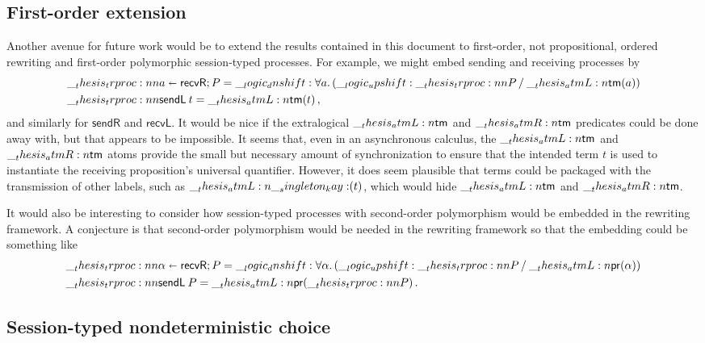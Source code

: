\subsection{First-order extension}

Another avenue for future work would be to extend the results contained in this document to first-order, not propositional, ordered rewriting and first-order polymorphic session-typed processes.
For example, we might embed sending and receiving processes by 
\begin{equation*}
  \begin{lgathered}[t]
    \trproc{a \shortleftarrow \mathsf{recvR}; P} = \dn \forall a.\, (\up \trproc{P} \pmir \atmL{\mathsf{tm}}(a)) \\
    \trproc{\mathsf{sendL}\:t} = \atmL{\mathsf{tm}}(t)
  \,,
  \end{lgathered}
\end{equation*}
and similarly for $\mathsf{sendR}$ and $\mathsf{recvL}$.
It would be nice if the extralogical $\__thesis_atmL:n {\mathsf{tm}}$ and $\__thesis_atmR:n {\mathsf{tm}}$ predicates could be done away with, but that appears to be impossible.
It seems that, even in an asynchronous calculus, the $\__thesis_atmL:n {\mathsf{tm}}$ and $\__thesis_atmR:n {\mathsf{tm}}$ atoms provide the small but necessary amount of synchronization to ensure that the intended term $t$ is used to instantiate the receiving proposition's universal quantifier.
However, it does seem plausible that terms could be packaged with the transmission of other labels, such as $\__thesis_atmL:n {\__singleton_kay:}(t)$, which would hide  $\__thesis_atmL:n {\mathsf{tm}}$ and $\__thesis_atmR:n {\mathsf{tm}}$.

It would also be interesting to consider how session-typed processes with second-order polymorphism\autocite{Caires+:ESOP13} would be embedded in the rewriting framework.
A conjecture is that second-order polymorphism would be needed in the rewriting framework so that the embedding could be something like 
\begin{equation*}
  \begin{lgathered}[t]
    \trproc{\alpha \shortleftarrow \mathsf{recvR}; P} = \dn \forall \alpha.\, (\up \trproc{P} \pmir \atmL{\mathsf{pr}}(\alpha)) \\
    \trproc{\mathsf{sendL}\:P} = \atmL{\mathsf{pr}}(\trproc{P})
  \,.
  \end{lgathered}
\end{equation*}


\subsection{Session-typed nondeterministic choice}

